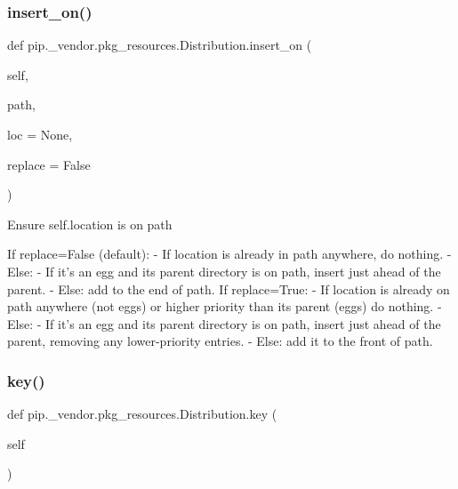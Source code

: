 \subsubsection{\texorpdfstring{insert\+\_\+on()}{insert\_on()}}
{\footnotesize\ttfamily def pip.\+\_\+vendor.\+pkg\+\_\+resources.\+Distribution.\+insert\+\_\+on (\begin{DoxyParamCaption}\item[{}]{self,  }\item[{}]{path,  }\item[{}]{loc = {\ttfamily None},  }\item[{}]{replace = {\ttfamily False} }\end{DoxyParamCaption})}

\begin{DoxyVerb}Ensure self.location is on path

If replace=False (default):
    - If location is already in path anywhere, do nothing.
    - Else:
      - If it's an egg and its parent directory is on path,
insert just ahead of the parent.
      - Else: add to the end of path.
If replace=True:
    - If location is already on path anywhere (not eggs)
      or higher priority than its parent (eggs)
      do nothing.
    - Else:
      - If it's an egg and its parent directory is on path,
insert just ahead of the parent,
removing any lower-priority entries.
      - Else: add it to the front of path.
\end{DoxyVerb}
 \mbox{\label{classpip_1_1__vendor_1_1pkg__resources_1_1Distribution_a0e2f9097224488dacdb150539b149888}} 
\subsubsection{\texorpdfstring{key()}{key()}}
{\footnotesize\ttfamily def pip.\+\_\+vendor.\+pkg\+\_\+resources.\+Distribution.\+key (\begin{DoxyParamCaption}\item[{}]{self }\end{DoxyParamCaption})}

\mbox{\label{classpip_1_1__vendor_1_1pkg__resources_1_1Distribution_a263ed52645359c1a003f0f8b0bfd666f}} 

